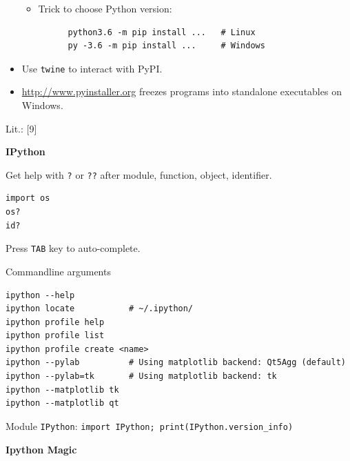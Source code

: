 \documentclass[9pt,a4wide]{extarticle}
\begin{document}
\begin{itemize}
\begin{itemize}
   \item Trick to choose Python version:
   
      \begin{verbatim}
      python3.6 -m pip install ...   # Linux
      py -3.6 -m pip install ...     # Windows
      \end{verbatim}

   \end{itemize}

   \item Use {\tt twine} to interact with PyPI.

   \item \url{http://www.pyinstaller.org} freezes programs into standalone
         executables on Windows.

\end{itemize}

Lit.: [9]

\label{ipython-section}

\medskip
{\bf IPython}

Get help with {\tt ?} or {\tt ??} after module, function, 
object, identifier.

\begin{verbatim}
import os
os?
id?
\end{verbatim}

Press {\tt TAB} key to auto-complete.

Commandline arguments

\begin{verbatim}
ipython --help
ipython locate           # ~/.ipython/
ipython profile help
ipython profile list
ipython profile create <name>
ipython --pylab          # Using matplotlib backend: Qt5Agg (default)
ipython --pylab=tk       # Using matplotlib backend: tk
ipython --matplotlib tk
ipython --matplotlib qt
\end{verbatim}

Module {\tt IPython}: {\tt import IPython; print(IPython.version\_info)}



\medskip
{\bf Ipython Magic}
\end{document}
